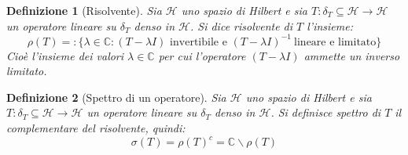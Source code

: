 \documentclass[a4paper,12pt]{report}
\newtheorem{definizione}{Definizione}[chapter]
\begin{document}
\begin{definizione}[Risolvente]

Sia $\mathscr{H}$ uno spazio di Hilbert e sia $T:\delta_T\subseteq\mathscr{H}\to\mathscr{H}$ un operatore lineare su $\delta_T$ denso in $\mathscr{H}$. Si dice risolvente di $T$ l'insieme:
\[\rho (T)=:\{\lambda\in \mathbb{C}:(T-\lambda I) \text{ invertibile e } (T-\lambda I)^{-1}\ \text{lineare e limitato}\}\]
Cioè l'insieme dei valori $\lambda \in \mathbb{C}$ per cui l'operatore $(T-\lambda I)$ ammette un inverso limitato.

\end{definizione}

\begin{definizione}[Spettro di un operatore]
    Sia $\mathscr{H}$ uno spazio di Hilbert e sia $T:\delta_T\subseteq \mathscr{H}\to \mathscr{H}$ un operatore lineare su $\delta_T$ denso in $\mathscr{H}$. Si definisce spettro di $T$ il complementare del risolvente, quindi:
    \[\sigma(T)=\rho (T)^c=\mathbb{C}\backslash\rho(T)\]
\end{definizione}
\end{document}
